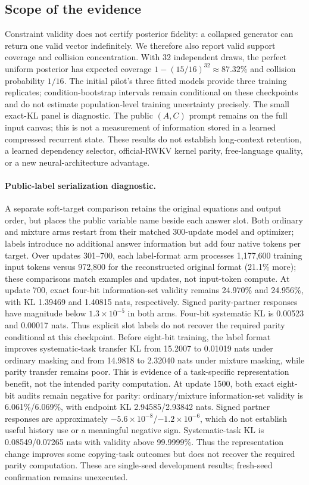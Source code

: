 

\subsection{Scope of the evidence}
Constraint validity does not certify posterior fidelity: a collapsed generator can return one valid vector indefinitely. We therefore also report valid support coverage and collision concentration. With 32 independent draws, the perfect uniform posterior has expected coverage $1-(15/16)^{32}\approx87.32\%$ and collision probability $1/16$. The initial pilot's three fitted models provide three training replicates; condition-bootstrap intervals remain conditional on these checkpoints and do not estimate population-level training uncertainty precisely. The small exact-KL panel is diagnostic. The public $(A,C)$ prompt remains on the full input canvas; this is not a measurement of information stored in a learned compressed recurrent state. These results do not establish long-context retention, a learned dependency selector, official-RWKV kernel parity, free-language quality, or a new neural-architecture advantage.

\paragraph{Public-label serialization diagnostic.}
A separate soft-target comparison retains the original equations and output order, but places the public variable name beside each answer slot. Both ordinary and mixture arms restart from their matched 300-update model and optimizer; labels introduce no additional answer information but add four native tokens per target. Over updates 301--700, each label-format arm processes 1,177,600 training input tokens versus 972,800 for the reconstructed original format (21.1\% more); these comparisons match examples and updates, not input-token compute. At update 700, exact four-bit information-set validity remains 24.970\% and 24.956\%, with KL 1.39469 and 1.40815 nats, respectively. Signed parity-partner responses have magnitude below $1.3\times10^{-5}$ in both arms. Four-bit systematic KL is 0.00523 and 0.00017 nats. Thus explicit slot labels do not recover the required parity conditional at this checkpoint. Before eight-bit training, the label format improves systematic-task transfer KL from 15.2007 to 0.01019 nats under ordinary masking and from 14.9818 to 2.32040 nats under mixture masking, while parity transfer remains poor. This is evidence of a task-specific representation benefit, not the intended parity computation. At update 1500, both exact eight-bit audits remain negative for parity: ordinary/mixture information-set validity is 6.061\%/6.069\%, with endpoint KL 2.94585/2.93842 nats. Signed partner responses are approximately $-5.6\times10^{-8}$/$-1.2\times10^{-6}$, which do not establish useful history use or a meaningful negative sign. Systematic-task KL is 0.08549/0.07265 nats with validity above 99.9999\%. Thus the representation change improves some copying-task outcomes but does not recover the required parity computation. These are single-seed development results; fresh-seed confirmation remains unexecuted.

